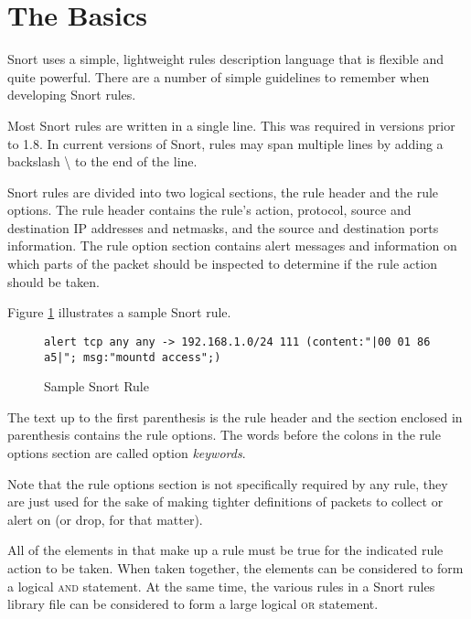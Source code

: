 \documentclass[english]{report}
\newenvironment{note}{
\samepage
    \vspace{10pt}{\textsf{
        {\hspace{7pt}\Huge{$\triangle$\hspace{-12.5pt}{\Large{$^!$}}}}\hspace{5pt}
        {\Large{NOTE}}
    }
    }
   \begin{center}
    \par\vspace{-17pt}

    \begin{lrbox}{\savepar}
    \begin{minipage}[r]{6in}
}
{
    \end{minipage}
    \end{lrbox}
    \fbox{
        \usebox{
            \savepar
        }
    }
    \par\vskip10pt
    \end{center}
}
\begin{document}
\section{The Basics}

Snort uses a simple, lightweight rules description language that is flexible
and quite powerful. There are a number of simple guidelines to remember when
developing Snort rules.

Most Snort rules are written in a single line. This was required in versions
prior to 1.8. In current versions of Snort, rules may span multiple lines by
adding a backslash \textbackslash{} to the end of the line. 

Snort rules are divided into two logical sections, the rule header and the rule
options. The rule header contains the rule's action, protocol, source and
destination IP addresses and netmasks, and the source and destination ports
information. The rule option section contains alert messages and information on
which parts of the packet should be inspected to determine if the rule action
should be taken.

Figure \ref{Sample Snort Rule} illustrates a sample Snort rule.

\begin{center}
\begin{figure}[!hbpt]
\begin{verbatim}
alert tcp any any -> 192.168.1.0/24 111 (content:"|00 01 86 a5|"; msg:"mountd access";)
\end{verbatim}

\caption{Sample Snort Rule\label{Sample Snort Rule}}
\end{figure}
\end{center}

The text up to the first parenthesis is the rule header and the section
enclosed in parenthesis contains the rule options. The words before the
colons in the rule options section are called option \emph{keywords}. 
\begin{note}
Note that the rule options section is not specifically required by any
rule, they are just used for the sake of making tighter definitions
of packets to collect or alert on (or drop, for that matter). 
\end{note}
All of the elements in that make up a rule must be true for the indicated
rule action to be taken. When taken together, the elements can be
considered to form a logical \textsc{and} statement. At the same time,
the various rules in a Snort rules library file can be considered
to form a large logical \textsc{or} statement. 
\end{document}
